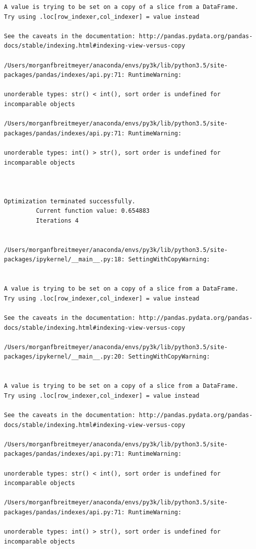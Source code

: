 \begin{lstlisting}
A value is trying to be set on a copy of a slice from a DataFrame.
Try using .loc[row_indexer,col_indexer] = value instead

See the caveats in the documentation: http://pandas.pydata.org/pandas-docs/stable/indexing.html#indexing-view-versus-copy

/Users/morganfbreitmeyer/anaconda/envs/py3k/lib/python3.5/site-packages/pandas/indexes/api.py:71: RuntimeWarning:

unorderable types: str() < int(), sort order is undefined for incomparable objects

/Users/morganfbreitmeyer/anaconda/envs/py3k/lib/python3.5/site-packages/pandas/indexes/api.py:71: RuntimeWarning:

unorderable types: int() > str(), sort order is undefined for incomparable objects



Optimization terminated successfully.
         Current function value: 0.654883
         Iterations 4


/Users/morganfbreitmeyer/anaconda/envs/py3k/lib/python3.5/site-packages/ipykernel/__main__.py:18: SettingWithCopyWarning:


A value is trying to be set on a copy of a slice from a DataFrame.
Try using .loc[row_indexer,col_indexer] = value instead

See the caveats in the documentation: http://pandas.pydata.org/pandas-docs/stable/indexing.html#indexing-view-versus-copy

/Users/morganfbreitmeyer/anaconda/envs/py3k/lib/python3.5/site-packages/ipykernel/__main__.py:20: SettingWithCopyWarning:


A value is trying to be set on a copy of a slice from a DataFrame.
Try using .loc[row_indexer,col_indexer] = value instead

See the caveats in the documentation: http://pandas.pydata.org/pandas-docs/stable/indexing.html#indexing-view-versus-copy

/Users/morganfbreitmeyer/anaconda/envs/py3k/lib/python3.5/site-packages/pandas/indexes/api.py:71: RuntimeWarning:

unorderable types: str() < int(), sort order is undefined for incomparable objects

/Users/morganfbreitmeyer/anaconda/envs/py3k/lib/python3.5/site-packages/pandas/indexes/api.py:71: RuntimeWarning:

unorderable types: int() > str(), sort order is undefined for incomparable objects




\end{lstlisting}
